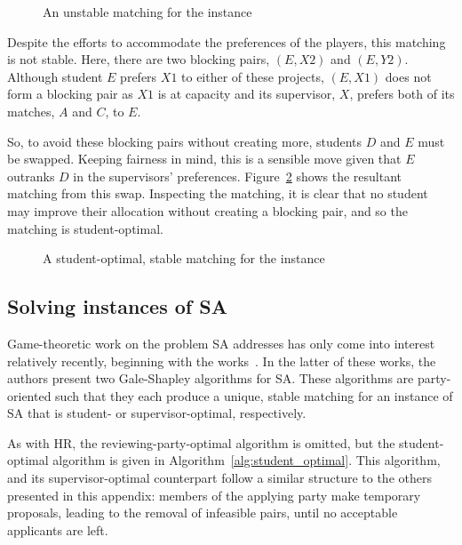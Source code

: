 \begin{figure}[htbp]
    \centering
    \resizebox{\imgwidth}{!}{%
        
    }\caption{An unstable matching for the instance}\label{fig:sa_unstable}
\end{figure}

Despite the efforts to accommodate the preferences of the players, this matching
is not stable. Here, there are two blocking pairs, \((E, X2)\) and \((E, Y2)\).
Although student \(E\) prefers \(X1\) to either of these projects, \((E, X1)\)
does not form a blocking pair as \(X1\) is at capacity and its supervisor,
\(X\), prefers both of its matches, \(A\) and \(C\), to \(E\).

So, to avoid these blocking pairs without creating more, students \(D\) and
\(E\) must be swapped. Keeping fairness in mind, this is a sensible move given
that \(E\) outranks \(D\) in the supervisors' preferences.
Figure~\ref{fig:sa_stable} shows the resultant matching from this swap.
Inspecting the matching, it is clear that no student may improve their
allocation without creating a blocking pair, and so the matching is
student-optimal.

\begin{figure}
    \centering
    \resizebox{\imgwidth}{!}{%
        
    }\caption{%
        A student-optimal, stable matching for the instance
    }\label{fig:sa_stable}
\end{figure}

\subsection{Solving instances of SA}

Game-theoretic work on the problem SA addresses has only come into interest
relatively recently, beginning with the works~\cite{Abraham2003,Abraham2007}. In
the latter of these works, the authors present two Gale-Shapley algorithms for
SA. These algorithms are party-oriented such that they each produce a unique,
stable matching for an instance of SA that is student- or supervisor-optimal,
respectively.

As with HR, the reviewing-party-optimal algorithm is omitted, but
the student-optimal algorithm is given in Algorithm~\ref{alg:student_optimal}.
This algorithm, and its supervisor-optimal counterpart follow a similar
structure to the others presented in this appendix: members of the
applying party make temporary proposals, leading to the removal of infeasible
pairs, until no acceptable applicants are left.

